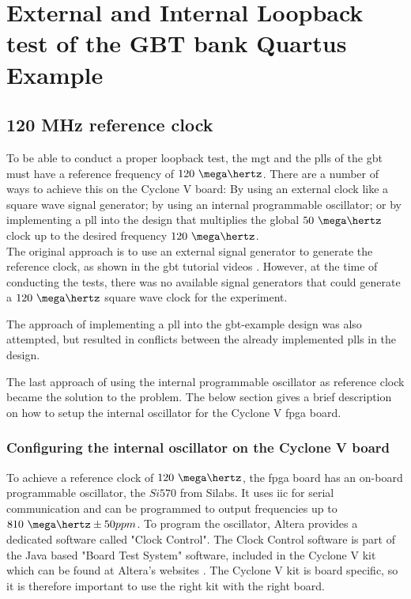 \documentclass[main.tex]{subfiles}
\begin{document}
\chapter{External and Internal Loopback test of the GBT bank Quartus Example}

\section{120 MHz reference clock}

To be able to conduct a proper loopback test, the \gls{mgt} and the \glspl{pll} of the \gls{gbt}  must have a reference frequency of $120~\mega\hertz$. There are a number of ways to achieve this on the Cyclone V board: By using an external clock like a square wave signal generator; by using an internal programmable oscillator; or by implementing a \gls{pll} into the design that multiplies the global $50~\mega\hertz$ clock up to the desired frequency $120~\mega\hertz$. \\

The original approach is to use an external signal generator to generate the reference clock, as shown in the \gls{gbt} tutorial videos \cite{gbt_videos}. However, at the time of conducting the tests, there was no available signal generators that could generate a $120~\mega\hertz$ square wave clock for the experiment. 

The approach of implementing a \gls{pll} into the \gls{gbt}-example design was also attempted, but resulted in conflicts between the already implemented \glspl{pll} in the design. 

The last approach of using the internal programmable oscillator as reference clock became the solution to the problem. The below section gives a brief description on how to setup the internal oscillator for the Cyclone V \gls{fpga} board.

\subsection{Configuring the internal oscillator on the Cyclone V board}

To achieve a reference clock of $120~\mega\hertz$, the \gls{fpga} board has an on-board programmable oscillator, the $Si570$ from Silabs. It uses \gls{iic} for serial communication and can be programmed to output frequencies up to $810~\mega\hertz \pm 50 ppm$. To program the oscillator, Altera provides a dedicated software called "Clock Control". The Clock Control software is part of the Java based "Board Test System" software, included in the Cyclone V kit which can be found at Altera's websites \cite{altera_cyclonekit}. The Cyclone V kit is board specific, so it is therefore important to use the right kit with the right board.\\
\end{document}
